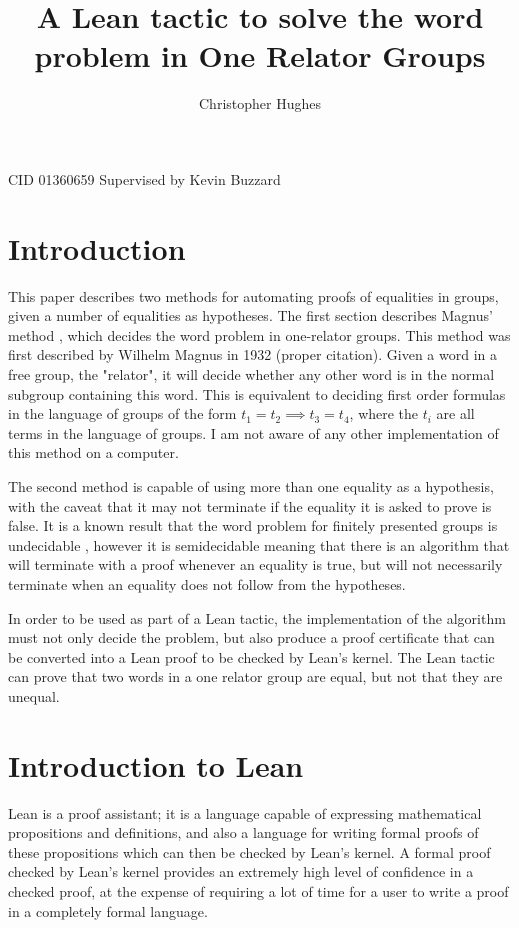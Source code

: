 \documentclass[12pt]{article} %
\title{A Lean tactic to solve the word problem in One Relator Groups}
\author{Christopher Hughes}
\theoremstyle{definition}
\theoremstyle{definition}
\theoremstyle{definition}
\theoremstyle{definition}
\theoremstyle{definition}
\theoremstyle{definition}
\begin{document}
\maketitle
CID 01360659 \newline
Supervised by Kevin Buzzard
\pagebreak
\tableofcontents
\pagebreak

\section{Introduction}

This paper describes two methods for automating proofs of equalities in groups, given
a number of equalities as hypotheses. The first section describes Magnus' method
\cite{mccool_schupp_1973}, which decides the word problem in one-relator groups.
This method was first described by Wilhelm Magnus in 1932 (proper citation). Given a word in
a free group, the "relator", it will decide whether any other word is in the
normal subgroup containing this word. This is equivalent to deciding first order
formulas in the language of groups of the form $t_1 = t_2 \implies t_3 = t_4$,
where the $t_i$ are all terms in the language of groups.
I am not aware of any other implementation of this method on a computer.

The second method is capable of using more than one equality as a hypothesis,
with the caveat that it may not terminate if the equality it is asked to prove is false.
It is a known result that the word problem for finitely presented groups is undecidable
\cite{collins1986}, however it is semidecidable meaning that  there is an algorithm
that will terminate with a proof whenever an equality is true, but will not necessarily
terminate when an equality does not follow from the hypotheses.

In order to be used as part of a Lean tactic, the implementation of the
algorithm must not only decide the problem, but also produce a proof certificate
that can be converted into a Lean proof to be checked by Lean's kernel. The Lean
tactic can prove that two words in a one relator group are equal,
but not that they are unequal.

\section{Introduction to Lean}

Lean \cite{de_moura_kong_avigad_van_doorn_von_raumer_2018} is a proof assistant; it is a language capable of expressing mathematical propositions
and definitions, and also a language for writing formal proofs of these propositions which
can then be checked by Lean's kernel. A formal proof checked by Lean's kernel provides
an extremely high level of confidence in a checked proof, at the expense of requiring a lot
of time for a user to write a proof in a completely formal language.
\end{document}
